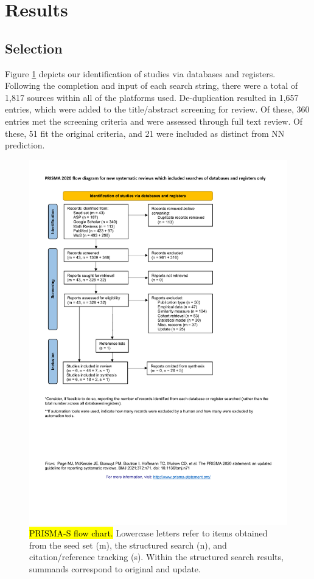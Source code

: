 \documentclass[sn-mathphys,Numbered,pdflatex]{sn-jnl}
\theoremstyle{remark}
\theoremstyle{definition}
\begin{document}
\section{Results}\label{results}

\subsection{Selection}\label{selection}

Figure \ref{fig:prisma} depicts our identification of studies via
databases and registers. Following the completion and input of each
search string, there were a total of 1,817 sources within all of the
platforms used. De-duplication resulted in 1,657 entries, which were
added to the title/abstract screening for review. Of these, 360 entries
met the screening criteria and were assessed through full text review.
Of these, 51 fit the original criteria, and 21 were included as distinct
from NN prediction.

\begin{figure}

{\centering \includegraphics[width=0.8\linewidth]{Fig1} 

}

\caption{\hl{PRISMA-S flow chart.}
 Lowercase letters refer to items obtained from
 the seed set (m),
 the structured search (n), and
 citation/reference tracking (s).
 Within the structured search results,
 summands correspond to original and update.}\label{fig:prisma}
\end{figure}
\end{document}
